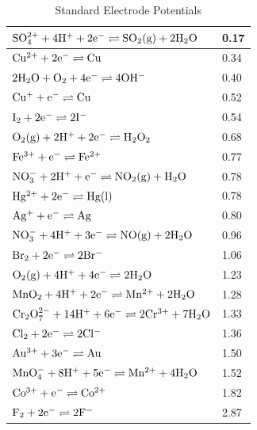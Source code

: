 \begin{table}[p]
\begin{center}
\begin{tabular}{|l|l|}
$\rm{SO_{4}^{2+} + 4H^{+} + 2e^{-} \rightleftharpoons SO_{2} (g) + 2H_{2}O }$& 0.17 \\ \hline
$\rm{Cu^{2+} + 2e^{-} \rightleftharpoons Cu }$& 0.34 \\ \hline
$\rm{2H_{2}O + O_{2} + 4e^{-} \rightleftharpoons 4OH^{-} }$& 0.40 \\ \hline
$\rm{Cu^{+} + e^{-} \rightleftharpoons Cu }$& 0.52 \\ \hline
$\rm{I_{2} + 2e^{-} \rightleftharpoons 2I^{-} }$& 0.54 \\ \hline
$\rm{O_{2} (g) + 2H^{+} + 2e^{-} \rightleftharpoons H_{2}O_{2} }$& 0.68 \\ \hline
$\rm{Fe^{3+} + e^{-} \rightleftharpoons Fe^{2+}  }$& 0.77 \\ \hline
$\rm{NO_{3}^{-} + 2H^{+} + e^{-} \rightleftharpoons NO_{2} (g) + H_{2}O }$& 0.78 \\ \hline
$\rm{Hg^{2+} + 2e^{-} \rightleftharpoons Hg (l) }$& 0.78 \\ \hline
$\rm{Ag^{+} + e^{-} \rightleftharpoons Ag }$& 0.80 \\ \hline
$\rm{NO_{3}^{-} + 4H^{+} +3 e^{-} \rightleftharpoons NO (g) + 2H_{2}O }$& 0.96 \\ \hline
$\rm{Br_{2} + 2e^{-} \rightleftharpoons 2Br^{-} }$& 1.06 \\ \hline
$\rm{O_{2} (g) + 4H^{+} + 4e^{-} \rightleftharpoons 2H_{2}O }$& 1.23 \\ \hline
$\rm{MnO_{2} + 4H^{+} + 2e^{-} \rightleftharpoons Mn^{2+} + 2H_{2}O }$& 1.28 \\ \hline
$\rm{Cr_{2}O_{7}^{2-} + 14H^{+} + 6e^{-} \rightleftharpoons 2Cr^{3+} + 7H_{2}O }$& 1.33 \\ \hline
$\rm{Cl_{2} + 2e^{-} \rightleftharpoons 2Cl^{-} }$& 1.36 \\ \hline
$\rm{Au^{3+} + 3e^{-} \rightleftharpoons Au }$& 1.50 \\ \hline
$\rm{MnO_{4}^{-} + 8H^{+} + 5e^{-} \rightleftharpoons Mn^{2+} + 4H_{2}O }$& 1.52 \\ \hline
$\rm{Co^{3+} + e^{-} \rightleftharpoons Co^{2+} }$& 1.82 \\ \hline
$\rm{F_{2} + 2e^{-} \rightleftharpoons 2F^{-} }$& 2.87 \\ \hline
\end{tabular}
\end{center}
\caption{Standard Electrode Potentials} 
\label{tab:electrochemical:table sep}
\end{table}
